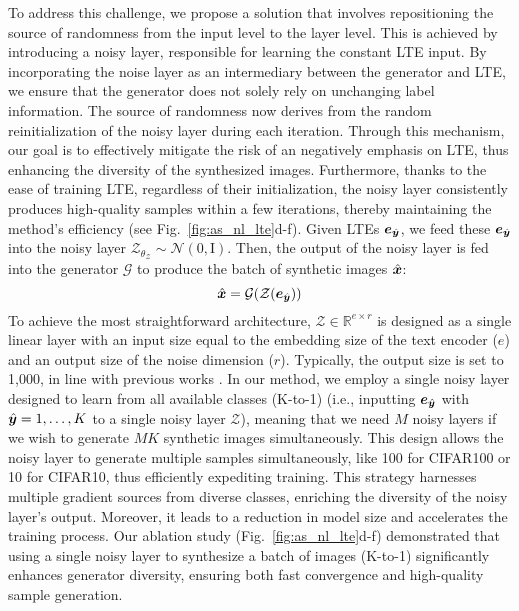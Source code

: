 \documentclass{article} %
\begin{document}
To address this challenge, we propose a solution that involves repositioning the source of randomness from the input level to the layer level. This is achieved by introducing a noisy layer, responsible for learning the constant LTE input. By incorporating the noise layer as an intermediary between the generator and LTE, we ensure that the generator does not solely rely on unchanging label information. The source of randomness now derives from the random reinitialization of the noisy layer during each iteration. Through this mechanism, our goal is to effectively mitigate the risk of an negatively emphasis on LTE, thus enhancing the diversity of the synthesized images. Furthermore, thanks to the ease of training LTE, regardless of their initialization, the noisy layer consistently produces high-quality samples within a few iterations, thereby maintaining the method's efficiency (see Fig.~\ref{fig:as_nl_lte}d-f). Given LTEs ${\bm{e}}_{\hat{{\bm{y}}}}$, we feed these ${\bm{e}}_{\hat{{\bm{y}}}}$ into the noisy layer $\mathcal{Z}_{\theta_{\mathcal{Z}}}\sim\mathcal{N}(0, \text{I})$. Then, the output of the noisy layer is fed into the generator $\mathcal{G}$ to produce the batch of synthetic images $\hat{{\bm{x}}}$:
\begin{equation}
    \hat{{\bm{x}}} = \mathcal{G}(\mathcal{Z}({\bm{e}}_{\hat{{\bm{y}}}}))
    \label{eq:v}
\end{equation}
To achieve the most straightforward architecture, $\mathcal{Z} \in \mathbb{R}^{e\times r}$ is designed as a single linear layer with an input size equal to the embedding size of the text encoder ($e$) and an output size of the noise dimension ($r$). Typically, the output size is set to 1,000, in line with previous works \citep{kakr, mad}. In our method, we employ a single noisy layer designed to learn from all available classes (K-to-1) (i.e., inputting ${\bm{e}}_{\hat{{\bm{y}}}}$ with $\hat{{\bm{y}}}= 1,\dots,K$ to a single noisy layer $\mathcal{Z}$), meaning that we need $M$ noisy layers if we wish to generate $MK$ synthetic images simultaneously. This design allows the noisy layer to generate multiple samples simultaneously, like 100 for CIFAR100 or 10 for CIFAR10, thus efficiently expediting training. This strategy harnesses multiple gradient sources from diverse classes, enriching the diversity of the noisy layer's output. Moreover, it leads to a reduction in model size and accelerates the training process. Our ablation study (Fig.~\ref{fig:as_nl_lte}d-f) demonstrated that using a single noisy layer to synthesize a batch of images (K-to-1) significantly enhances generator diversity, ensuring both fast convergence and high-quality sample generation.
\end{document}
